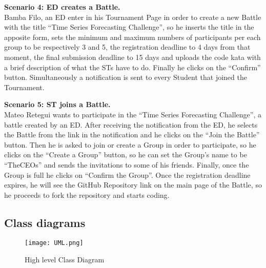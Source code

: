 \textbf{Scenario 4: ED creates a Battle.}\\
Bamba Filo, an ED enter in his Tournament Page in order to create a new Battle with the title “Time Series Forecasting Challenge”, so he inserts the title in the apposite form, sets the minimum and maximum numbers of participants per each group to be respectively 3 and 5, the registration deadline to 4 days from that moment, the final submission deadline to 15 days and uploads the code kata with a brief description of what the STs have to do. Finally he clicks on the “Confirm” button. Simultaneously a notification is sent to every Student that joined the Tournament.

\textbf{Scenario 5: ST joins a Battle.}\\
Mateo Retegui wants to participate in the “Time Series Forecasting Challenge”, a battle created by an ED. After receiving the notification from the ED, he selects the Battle from the link in the notification and he clicks on the “Join the Battle” button. Then he is asked to join or create a Group in order to participate, so he clicks on the “Create a Group'' button, so he can set the Group’s name to be “TheCEOs” and sends the invitations to some of his friends. Finally, once the Group is full he clicks on “Confirm the Group”. Once the registration deadline expires, he will see the GitHub Repository link on the main page of the Battle, so he proceeds to fork the repository and starts coding.



\subsection{Class diagrams}
\label{subsec:class_diagrams}%


\begin{figure}[H]
    \begin{center}
        \texttt{[image: UML.png]}
        \caption{High level Class Diagram}
        \label{fig:UML}%
    \end{center}
\end{figure}

